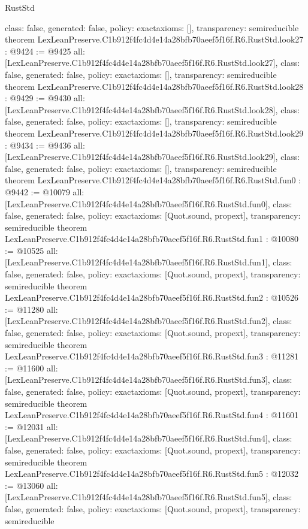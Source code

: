\begin{lexlean}{RustStd}
\begin{coremodule}
{  class: false,
  generated: false,
  policy: exact{axioms: []},
  transparency: semireducible
}
theorem LexLeanPreserve.C1b912f4fc4d4e14a28bfb70aeef5f16f.R6.RustStd.look27 : @9424 := @9425 {
  all: [LexLeanPreserve.C1b912f4fc4d4e14a28bfb70aeef5f16f.R6.RustStd.look27],
  class: false,
  generated: false,
  policy: exact{axioms: []},
  transparency: semireducible
}
theorem LexLeanPreserve.C1b912f4fc4d4e14a28bfb70aeef5f16f.R6.RustStd.look28 : @9429 := @9430 {
  all: [LexLeanPreserve.C1b912f4fc4d4e14a28bfb70aeef5f16f.R6.RustStd.look28],
  class: false,
  generated: false,
  policy: exact{axioms: []},
  transparency: semireducible
}
theorem LexLeanPreserve.C1b912f4fc4d4e14a28bfb70aeef5f16f.R6.RustStd.look29 : @9434 := @9436 {
  all: [LexLeanPreserve.C1b912f4fc4d4e14a28bfb70aeef5f16f.R6.RustStd.look29],
  class: false,
  generated: false,
  policy: exact{axioms: []},
  transparency: semireducible
}
theorem LexLeanPreserve.C1b912f4fc4d4e14a28bfb70aeef5f16f.R6.RustStd.fun0 : @9442 := @10079 {
  all: [LexLeanPreserve.C1b912f4fc4d4e14a28bfb70aeef5f16f.R6.RustStd.fun0],
  class: false,
  generated: false,
  policy: exact{axioms: [Quot.sound, propext]},
  transparency: semireducible
}
theorem LexLeanPreserve.C1b912f4fc4d4e14a28bfb70aeef5f16f.R6.RustStd.fun1 : @10080 := @10525 {
  all: [LexLeanPreserve.C1b912f4fc4d4e14a28bfb70aeef5f16f.R6.RustStd.fun1],
  class: false,
  generated: false,
  policy: exact{axioms: [Quot.sound, propext]},
  transparency: semireducible
}
theorem LexLeanPreserve.C1b912f4fc4d4e14a28bfb70aeef5f16f.R6.RustStd.fun2 : @10526 := @11280 {
  all: [LexLeanPreserve.C1b912f4fc4d4e14a28bfb70aeef5f16f.R6.RustStd.fun2],
  class: false,
  generated: false,
  policy: exact{axioms: [Quot.sound, propext]},
  transparency: semireducible
}
theorem LexLeanPreserve.C1b912f4fc4d4e14a28bfb70aeef5f16f.R6.RustStd.fun3 : @11281 := @11600 {
  all: [LexLeanPreserve.C1b912f4fc4d4e14a28bfb70aeef5f16f.R6.RustStd.fun3],
  class: false,
  generated: false,
  policy: exact{axioms: [Quot.sound, propext]},
  transparency: semireducible
}
theorem LexLeanPreserve.C1b912f4fc4d4e14a28bfb70aeef5f16f.R6.RustStd.fun4 : @11601 := @12031 {
  all: [LexLeanPreserve.C1b912f4fc4d4e14a28bfb70aeef5f16f.R6.RustStd.fun4],
  class: false,
  generated: false,
  policy: exact{axioms: [Quot.sound, propext]},
  transparency: semireducible
}
theorem LexLeanPreserve.C1b912f4fc4d4e14a28bfb70aeef5f16f.R6.RustStd.fun5 : @12032 := @13060 {
  all: [LexLeanPreserve.C1b912f4fc4d4e14a28bfb70aeef5f16f.R6.RustStd.fun5],
  class: false,
  generated: false,
  policy: exact{axioms: [Quot.sound, propext]},
  transparency: semireducible
}
\end{coremodule}
\end{lexlean}
